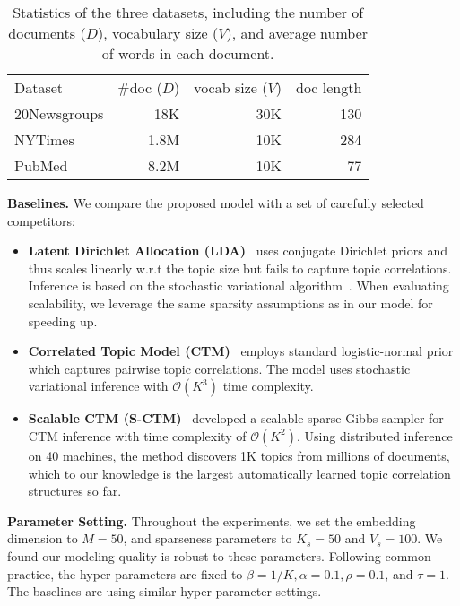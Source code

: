 \documentclass[sigconf]{acmart}
\begin{document}
\begin{table}[!t]
\centering
\begin{tabular}{l r r r}
\cmidrule[\heavyrulewidth]{1-4}
Dataset  & \#doc ($D$)  & vocab size ($V$) & doc length \\
\cmidrule{1-4}
20Newsgroups  & 18K & 30K & 130\\
NYTimes     & 1.8M & 10K & 284 \\
PubMed    & 8.2M & 10K & 77\\
\cmidrule[\heavyrulewidth]{1-4}
\end{tabular}
\caption{Statistics of the three datasets, including the number of documents ($D$), vocabulary size ($V$), and average number of words in each document.} 
\label{tb:data}
\vspace{-14pt}
\end{table}
%
\noindent\textbf{Baselines. }
We compare the proposed model with a set of carefully selected competitors:
\begin{itemize}
\item  {\bf Latent Dirichlet Allocation (LDA)}~\cite{blei2003latent} uses conjugate Dirichlet priors and thus scales linearly w.r.t the topic size but fails to capture topic correlations. Inference is based on the stochastic variational algorithm~\cite{hoffman2013stochastic}. When evaluating scalability, we leverage the same sparsity assumptions as in our model for speeding up.
\item {\bf Correlated Topic Model (CTM)}~\cite{blei2007correlated} employs standard logistic-normal prior which captures pairwise topic correlations. The model uses stochastic variational inference with $\mathcal{O}(K^3)$ time complexity.
\item {\bf Scalable CTM (S-CTM)}~\cite{chen2013scalable} developed a scalable sparse Gibbs sampler for CTM inference with time complexity of $\mathcal{O}(K^2)$. Using distributed inference on 40 machines, the method discovers 1K topics from millions of documents, which to our knowledge is the largest automatically learned topic correlation structures so far.
\end{itemize}

\noindent\textbf{Parameter Setting. }Throughout the experiments, we set the embedding dimension to $M=50$, and sparseness parameters to $K_s = 50$ and $V_s = 100$. We found our modeling quality is robust to these parameters. Following common practice, the hyper-parameters are fixed to $\beta = 1/K, \alpha = 0.1, \rho = 0.1$, and $\tau=1$. The baselines are using similar hyper-parameter settings.
\end{document}
